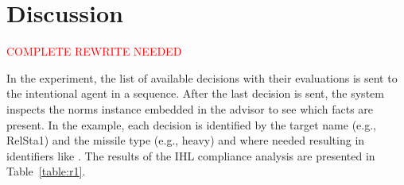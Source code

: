 %
%
%
%
\section{Discussion}
\textcolor{red}{COMPLETE REWRITE NEEDED}

In the experiment, the list of available decisions with their evaluations is sent to the intentional agent in a sequence. After the last decision is sent, the system inspects the norms instance embedded in the advisor to see which facts are present. In the example, each decision is identified by the target name (e.g., RelSta1) and the missile type (e.g., heavy) and where needed resulting in identifiers like . The results of the IHL compliance analysis are presented in Table~\ref{table:r1}. 


